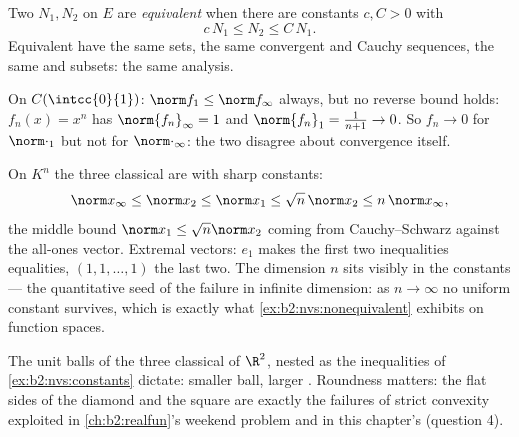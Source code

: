 \begin{definition}\label{def:b2:nvs:equivalent}
Two  $N_1, N_2$ on $E$ are \emph{equivalent} when there are constants $c, C > 0$ with
\[
c\,N_1 \leq N_2 \leq C\, N_1 .
\]
Equivalent  have the same  sets, the same convergent and
Cauchy sequences, the same  and  subsets: the same
analysis.
\end{definition}

\begin{example}\label{ex:b2:nvs:nonequivalent}
On $C(\intcc{0}{1})$: $\norm f_1 \leq \norm f_\infty$ always, but
no reverse bound holds: $f_n(x) = x^n$ has $\norm{f_n}_\infty = 1$
and $\norm{f_n}_1 = \frac{1}{n+1} \to 0$. So $f_n \to 0$ for
$\norm\cdot_1$ but not for $\norm\cdot_\infty$: the two 
disagree about convergence itself.
\end{example}

\begin{example}\label{ex:b2:nvs:constants}
On $K^n$ the three classical  are  with sharp
constants:
\[
\norm x_\infty \leq \norm x_2 \leq \norm x_1
\leq \sqrt n\,\norm x_2 \leq n\,\norm x_\infty ,
\]
the middle bound $\norm x_1 \leq \sqrt n\norm x_2$ coming from
Cauchy--Schwarz against the all-ones vector. Extremal vectors:
$e_1$ makes the first two inequalities equalities, $(1, 1,
\dots, 1)$ the last two. The dimension $n$ sits visibly in the
constants --- the quantitative seed of the failure in infinite
dimension: as $n \to \infty$ no uniform constant survives,
which is exactly what \cref{ex:b2:nvs:nonequivalent} exhibits on
function spaces.
\end{example}

\begin{omfigure}

{\small The unit balls of the three classical  of $\R^2$,
nested as the inequalities of \cref{ex:b2:nvs:constants}
dictate: smaller ball, larger . Roundness matters: the flat
sides of the diamond and the square are exactly the failures of
strict convexity exploited in \cref{ch:b2:realfun}'s weekend
problem and in this chapter's (question 4).}
\end{omfigure}

